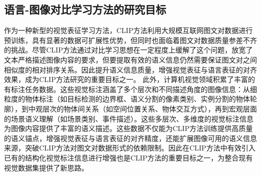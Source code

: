 
\subsection{语言-图像对比学习方法的研究目标}
\label{sec:clip-target}
作为一种新型的视觉表征学习方法，CLIP方法利用大规模互联网图文对数据进行预训练，具有显著的数据可扩展性优势，但同时也面临着图文对数据质量参差不齐的挑战。尽管CLIP方法通过对比学习思想在一定程度上缓解了这个问题，放宽了文本严格描述图像内容的要求，但要提取有效的语义信息仍然需要保证图文对之间相似度的相对排序关系。因此提升语义信息质量，增强视觉表征与语言表征的对齐效果，成为CLIP方法研究的重要目标之一。
此外，计算机视觉领域积累了丰富的有标注任务数据。这些视觉标注涵盖了多个层次和不同描述角度的图像信息：从细粒度的物体标注（如目标检测的边界框、语义分割的像素类别、实例分割的物体轮廓），到中观层次的物体间关系（如空间位置关系、物体交互方式），再到宏观层面的场景语义理解（如场景类别、事件描述）。这些多层次、多维度的视觉标注信息为图像内容提供了丰富的语义描述。这些数据不仅能为CLIP方法训练提供高质量的语义锚点，增强视觉表征与语言表征的对齐精度，还能扩展图像可用的语义信息来源，突破CLIP方法对图文对数据形式的依赖限制。因此在CLIP方法中有效引入已有的结构化视觉标注信息进行增强也是CLIP方法的重要目标之一，为整合现有视觉数据集提供了新思路。

